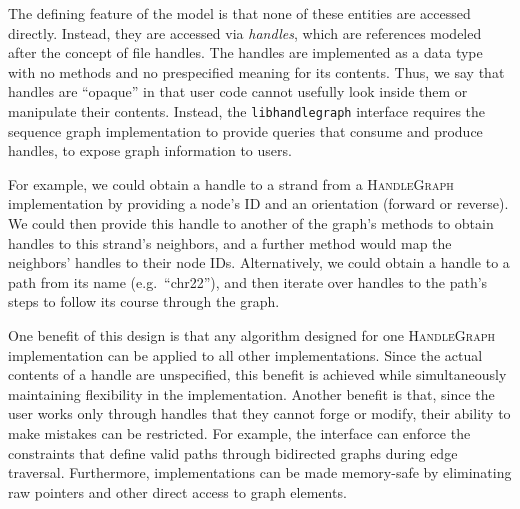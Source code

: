 \documentclass[11pt]{ucthesis}
\begin{document}
The defining feature of the model is that none of these entities are accessed directly.
Instead, they are accessed via \emph{handles}, which are references modeled after the concept of file handles.
The handles are implemented as a data type with no methods and no prespecified meaning for its contents.
Thus, we say that handles are ``opaque'' in that user code cannot usefully look inside them or manipulate their contents.
Instead, the \texttt{libhandlegraph} interface requires the sequence graph implementation to provide queries that consume and produce handles, to expose graph information to users.

For example, we could obtain a handle to a strand from a \textsc{HandleGraph} implementation by providing a node's ID and an orientation (forward or reverse).
We could then provide this handle to another of the graph's methods to obtain handles to this strand's neighbors, and a further method would map the neighbors' handles to their node IDs.
Alternatively, we could obtain a handle to a path from its name (e.g.\ ``chr22''), and then iterate over handles to the path's steps to follow its course through the graph.

One benefit of this design is that any algorithm designed for one \textsc{HandleGraph} implementation can be applied to all other implementations.
Since the actual contents of a handle are unspecified, this benefit is achieved while simultaneously maintaining flexibility in the implementation.
Another benefit is that, since the user works only through handles that they cannot forge or modify, their ability to make mistakes can be restricted.
For example, the interface can enforce the constraints that define valid paths through bidirected graphs during edge traversal.
Furthermore, implementations can be made memory-safe by eliminating raw pointers and other direct access to graph elements.

 
\end{document}
